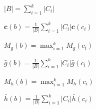 \begin{centreditemize}

\item $\displaystyle |B| = \sum_{i=1}^k |C_i|$

\item $\displaystyle \mathbf{c}(b) = \frac{1}{|B|} \sum_{i=1}^k |C_i| \mathbf{c}(c_i)$

\item $\displaystyle M_g(b) = \max_{i=1}^k M_g(c_i)$

\item $\displaystyle \bar{g}(b) = \frac{1}{|B|} \sum_{i=1}^k |C_i| \bar{g}(c_i)$

\item $\displaystyle M_h(b) = \max_{i=1}^k M_h(c_i)$

\item $\displaystyle \bar{h}(b) = \frac{1}{|B|} \sum_{i=1}^k |C_i| \bar{h}(c_i)$

\end{centreditemize}

